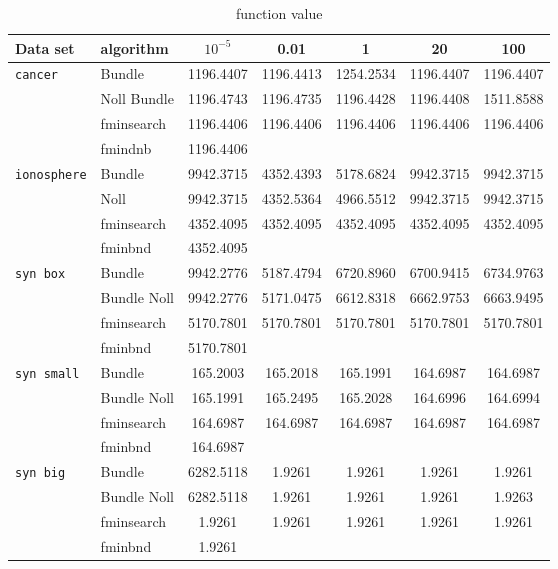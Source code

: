 \begin{center}
\begin{table}[H]%
	\begin{tabular}{llccccc}
		\hline
    Data set & algorithm & \(10^{-5}\) & 0.01 & 1 & 20 & 100 \\
		\hline
		\texttt{cancer} & Bundle & 1196.4407 &	1196.4413 &	1254.2534 & 1196.4407 &	1196.4407 \\
		 & Noll Bundle & 1196.4743 &	1196.4735 &	1196.4428 &	1196.4408 &	1511.8588   \\
		 &  fminsearch & 1196.4406 &	1196.4406 &	1196.4406 &	1196.4406 &	1196.4406 \\
		 & fmindnb & 1196.4406 \\
		\texttt{ionosphere} & Bundle & 9942.3715& 4352.4393 &	5178.6824 &	9942.3715	& 9942.3715  \\
		 & Noll & 9942.3715 & 4352.5364 &	4966.5512 &	9942.3715 & 	9942.3715 \\
		 & fminsearch & 4352.4095 &	4352.4095 &	4352.4095 &	4352.4095 &	4352.4095 \\
		 & fminbnd & 4352.4095 \\
		\texttt{syn box} & Bundle &  9942.2776 &	5187.4794 &	6720.8960 &	6700.9415 & 6734.9763\\
		 & Bundle Noll & 9942.2776 &	5171.0475 &	6612.8318 &	6662.9753 &	6663.9495  \\
		 & fminsearch & 5170.7801 &	5170.7801 &	5170.7801 &	5170.7801 &	5170.7801\\
		 & fminbnd & 5170.7801\\
		\texttt{syn small} & Bundle & 165.2003 & 165.2018 &	165.1991 &	164.6987 &	164.6987 \\
		 & Bundle Noll & 165.1991 &	165.2495 &	165.2028 &	164.6996	& 164.6994  \\
		 & fminsearch & 164.6987 &	164.6987 &	164.6987 & 164.6987 & 164.6987 \\
		 & fminbnd & 164.6987 \\
		\texttt{syn big} & Bundle & 6282.5118 &	1.9261 &	1.9261 &	1.9261 & 1.9261 \\
		 & Bundle Noll & 6282.5118 &	1.9261 &	1.9261 &	1.9261 &	1.9263 \\
		 & fminsearch & 1.9261 & 1.9261 & 1.9261 & 1.9261 & 1.9261  \\
		 & fminbnd & 1.9261  \\
	\end{tabular}
	\caption{function value}
\end{table}
\end{center}

